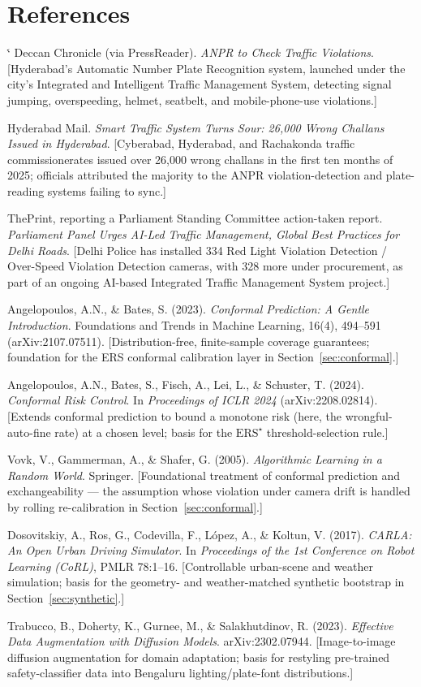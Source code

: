 \documentclass[11pt,a4paper]{article}
\makeatletter
\renewcommand{\refname}{References}
\renewenvironment{thebibliography}[1]
  {\section*{\refname}%
   \@mkboth{\refname}{\refname}%
   \list{\@biblabel{\@arabic\c@enumiv}}%
        {\settowidth\labelwidth{\@biblabel{#1}}%
         \leftmargin\labelwidth
         \advance\leftmargin\labelsep
         \@openbib@code
         \usecounter{enumiv}%
         \let\p@enumiv\@empty
         \renewcommand\theenumiv{\@arabic\c@enumiv}}%
   \sloppy
   \clubpenalty4000
   \@clubpenalty \clubpenalty
   \widowpenalty4000%
   \sfcode`\.\@m}
  {\def\@noitemerr{\@latex@warning{Empty `thebibliography' environment}}%
   \endlist}
\makeatother
\begin{document}
\begin{thebibliography}{9}
Deccan Chronicle (via PressReader).
\textit{ANPR to Check Traffic Violations}.
[Hyderabad's Automatic Number Plate Recognition system, launched under the city's Integrated and Intelligent Traffic Management System, detecting signal jumping, overspeeding, helmet, seatbelt, and mobile-phone-use violations.]

Hyderabad Mail.
\textit{Smart Traffic System Turns Sour: 26,000 Wrong Challans Issued in Hyderabad}.
[Cyberabad, Hyderabad, and Rachakonda traffic commissionerates issued over 26,000 wrong challans in the first ten months of 2025; officials attributed the majority to the ANPR violation-detection and plate-reading systems failing to sync.]

ThePrint, reporting a Parliament Standing Committee action-taken report.
\textit{Parliament Panel Urges AI-Led Traffic Management, Global Best Practices for Delhi Roads}.
[Delhi Police has installed 334 Red Light Violation Detection / Over-Speed Violation Detection cameras, with 328 more under procurement, as part of an ongoing AI-based Integrated Traffic Management System project.]

Angelopoulos, A.N., \& Bates, S. (2023).
\textit{Conformal Prediction: A Gentle Introduction}.
Foundations and Trends in Machine Learning, 16(4), 494--591 (arXiv:2107.07511).
[Distribution-free, finite-sample coverage guarantees; foundation for the ERS conformal calibration layer in Section~\ref{sec:conformal}.]

Angelopoulos, A.N., Bates, S., Fisch, A., Lei, L., \& Schuster, T. (2024).
\textit{Conformal Risk Control}.
In \textit{Proceedings of ICLR 2024} (arXiv:2208.02814).
[Extends conformal prediction to bound a monotone risk (here, the wrongful-auto-fine rate) at a chosen level; basis for the $\text{ERS}^{\star}$ threshold-selection rule.]

Vovk, V., Gammerman, A., \& Shafer, G. (2005).
\textit{Algorithmic Learning in a Random World}.
Springer.
[Foundational treatment of conformal prediction and exchangeability --- the assumption whose violation under camera drift is handled by rolling re-calibration in Section~\ref{sec:conformal}.]

Dosovitskiy, A., Ros, G., Codevilla, F., L\'opez, A., \& Koltun, V. (2017).
\textit{CARLA: An Open Urban Driving Simulator}.
In \textit{Proceedings of the 1st Conference on Robot Learning (CoRL)}, PMLR 78:1--16.
[Controllable urban-scene and weather simulation; basis for the geometry- and weather-matched synthetic bootstrap in Section~\ref{sec:synthetic}.]

Trabucco, B., Doherty, K., Gurnee, M., \& Salakhutdinov, R. (2023).
\textit{Effective Data Augmentation with Diffusion Models}.
arXiv:2302.07944.
[Image-to-image diffusion augmentation for domain adaptation; basis for restyling pre-trained safety-classifier data into Bengaluru lighting/plate-font distributions.]



\end{thebibliography}
\end{document}
